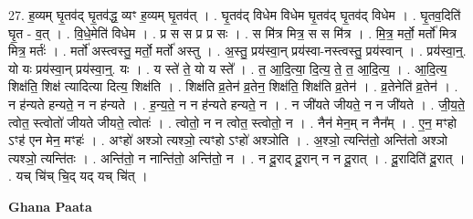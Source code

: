 \documentclass[17pt]{extarticle}
\begin{document}
27. ह॒व्यम् घृ॒तव॑द् घृ॒तव॑द्ध॒ व्यꣳ ह॒व्यम् घृ॒तव॑त् । . घृ॒तव॑द् विधेम विधेम घृ॒तव॑द् घृ॒तव॑द् विधेम । . घृ॒तव॒दिति॑ घृ॒त - व॒त् । . वि॒धे॒मेति॑ विधेम । . प्र स स प्र प्र सः । . स मि॑त्र मित्र॒ स स मि॑त्र । . मि॒त्र॒ मर्तो॒ मर्तो॑ मित्र मित्र॒ मर्तः॑ । . मर्तो॑ अस्त्वस्तु॒ मर्तो॒ मर्तो॑ अस्तु । . अ॒स्तु॒ प्रय॑स्वा॒न् प्रय॑स्वा-नस्त्वस्तु॒ प्रय॑स्वान् । . प्रय॑स्वा॒न्॒. यो यः प्रय॑स्वा॒न् प्रय॑स्वा॒न्॒. यः । . य स्ते॑ ते॒ यो य स्ते᳚ । . त॒ आ॒दि॒त्या॒ दि॒त्य॒ ते॒ त॒ आ॒दि॒त्य॒ । . आ॒दि॒त्य॒ शिक्ष॑ति॒ शिक्ष॑ त्यादित्या दित्य॒ शिक्ष॑ति । . शिक्ष॑ति व्र॒तेन॑ व्र॒तेन॒ शिक्ष॑ति॒ शिक्ष॑ति व्र॒तेन॑ । . व्र॒तेनेति॑ व्र॒तेन॑ । . न ह॑न्यते हन्यते॒ न न ह॑न्यते । . ह॒न्य॒ते॒ न न ह॑न्यते हन्यते॒ न । . न जी॑यते जीयते॒ न न जी॑यते । . जी॒य॒ते॒ त्वोत॒ स्त्वोतो॑ जीयते जीयते॒ त्वोतः॑ । . त्वोतो॒ न न त्वोत॒ स्त्वोतो॒ न । . नैन॑ मेन॒म् न नैन᳚म् । . ए॒न॒ मꣳहो ऽꣳह॑ एन मेन॒ मꣳहः॑ । . अꣳहो॑ अश्ञो त्यश्ञो॒ त्यꣳहो ऽꣳहो॑ अश्ञोति । . अ॒श्ञो॒ त्यन्ति॑तो॒ अन्ति॑तो अश्ञो त्यश्ञो॒ त्यन्ति॑तः । . अन्ति॑तो॒ न नान्ति॑तो॒ अन्ति॑तो॒ न । . न दू॒राद् दू॒रान् न न दू॒रात् । . दू॒रादिति॑ दू॒रात् । . यच् चि॑च् चि॒द् यद् यच् चि॑त् । \newline

\textbf{Ghana Paata } \newline
\end{document}
